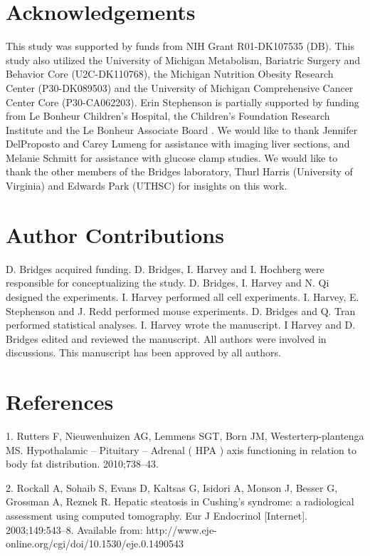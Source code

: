 \documentclass[11pt]{article} %
\begin{document}
\section*{Acknowledgements}\label{acknowledgements}

This study was supported by funds from NIH Grant R01-DK107535 (DB). This
study also utilized the University of Michigan Metabolism, Bariatric
Surgery and Behavior Core (U2C-DK110768), the Michigan Nutrition Obesity
Research Center (P30-DK089503) and the University of Michigan
Comprehensive Cancer Center Core (P30-CA062203). Erin Stephenson is
partially supported by funding from Le Bonheur Children's Hospital, the
Children's Foundation Research Institute and the Le Bonheur Associate
Board . We would like to thank Jennifer DelProposto and Carey Lumeng for
assistance with imaging liver sections, and Melanie Schmitt for
assistance with glucose clamp studies. We would like to thank the other
members of the Bridges laboratory, Thurl Harris (University of Virginia)
and Edwards Park (UTHSC) for insights on this work.

\section*{Author Contributions}
D. Bridges acquired funding. D. Bridges, I. Harvey and I. Hochberg were responsible for conceptualizing the study. D. Bridges, I. Harvey and N. Qi designed the experiments. I. Harvey performed all cell experiments. I. Harvey, E. Stephenson and J. Redd performed mouse experiments. D. Bridges and Q. Tran performed statistical analyses. I. Harvey wrote the manuscript. I Harvey and D. Bridges edited and reviewed the manuscript. All authors were involved in discussions. This manuscript has been approved by all authors.

\section*{References}\label{references}

1. Rutters F, Nieuwenhuizen AG, Lemmens SGT, Born JM,
Westerterp-plantenga MS. Hypothalamic -- Pituitary -- Adrenal ( HPA )
axis functioning in relation to body fat distribution. 2010;738--43.

2. Rockall A, Sohaib S, Evans D, Kaltsas G, Isidori A, Monson J, Besser
G, Grossman A, Reznek R. Hepatic steatosis in Cushing's syndrome: a
radiological assessment using computed tomography. Eur J Endocrinol
{[}Internet{]}. 2003;149:543--8. Available from:
http://www.eje-online.org/cgi/doi/10.1530/eje.0.1490543
\end{document}
